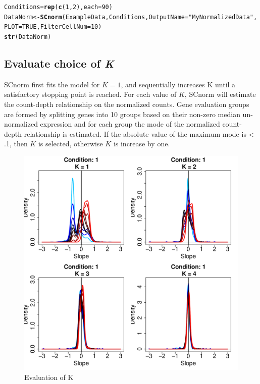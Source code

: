 \documentclass{article}\usepackage[]{graphicx}\usepackage[usenames,dvipsnames]{color}
\makeatletter
\newcommand{\hlnum}[1]{\textcolor[rgb]{0.686,0.059,0.569}{#1}}%
\newcommand{\hlstr}[1]{\textcolor[rgb]{0.192,0.494,0.8}{#1}}%
\newcommand{\hlstd}[1]{\textcolor[rgb]{0.345,0.345,0.345}{#1}}%
\newcommand{\hlkwb}[1]{\textcolor[rgb]{0.69,0.353,0.396}{#1}}%
\newcommand{\hlkwc}[1]{\textcolor[rgb]{0.333,0.667,0.333}{#1}}%
\newcommand{\hlkwd}[1]{\textcolor[rgb]{0.737,0.353,0.396}{\textbf{#1}}}%
\newenvironment{kframe}{%
 \def\at@end@of@kframe{}%
 \ifinner\ifhmode%
  \def\at@end@of@kframe{\end{minipage}}%
  \begin{minipage}{\columnwidth}%
 \fi\fi%
 \def\FrameCommand##1{\hskip\@totalleftmargin \hskip-\fboxsep
 \colorbox{shadecolor}{##1}\hskip-\fboxsep
     \hskip-\linewidth \hskip-\@totalleftmargin \hskip\columnwidth}%
 \MakeFramed {\advance\hsize-\width
   \@totalleftmargin\z@ \linewidth\hsize
   \@setminipage}}%
 {\par\unskip\endMakeFramed%
 \at@end@of@kframe}
\newenvironment{knitrout}{}{} %
\makeatother
\begin{document}
\begin{knitrout}
\color{fgcolor}\begin{kframe}
\begin{alltt}
\hlstd{Conditions} \hlkwb{=} \hlkwd{rep}\hlstd{(}\hlkwd{c}\hlstd{(}\hlnum{1}\hlstd{,}\hlnum{2}\hlstd{),} \hlkwc{each}\hlstd{=} \hlnum{90}\hlstd{)}
\hlstd{DataNorm} \hlkwb{<-} \hlkwd{SCnorm}\hlstd{(ExampleData, Conditions,} \hlkwc{OutputName} \hlstd{=} \hlstr{"MyNormalizedData"}\hlstd{,}
                     \hlkwc{PLOT}\hlstd{=}\hlnum{TRUE}\hlstd{,} \hlkwc{FilterCellNum} \hlstd{=} \hlnum{10}\hlstd{)}
\hlkwd{str}\hlstd{(DataNorm)}
\end{alltt}
\end{kframe}
\end{knitrout}
  



\subsection{Evaluate choice of \textit{K}}
\label{sec:NormalizationK}

SCnorm first fits the model for $K = 1$, and sequentially increases K until a satisfactory stopping point is reached. For each value of $K$, SCnorm will estimate the count-depth relationship on the normalized counts. Gene evaluation groups are formed by splitting genes into 10 groups based on their non-zero median un-normalized expression and for each group the mode of the normalized count-depth relationship is estimated. If the absolute value of the maximum mode is < .1, then $K$ is selected, otherwise $K$ is increase by one.


\begin{figure}[h!]
\centering
\includegraphics[width=.5\textwidth]{MyNormalizedData_k_evaluation.pdf}
\caption{Evaluation of K}
\end{figure}
\end{document}
